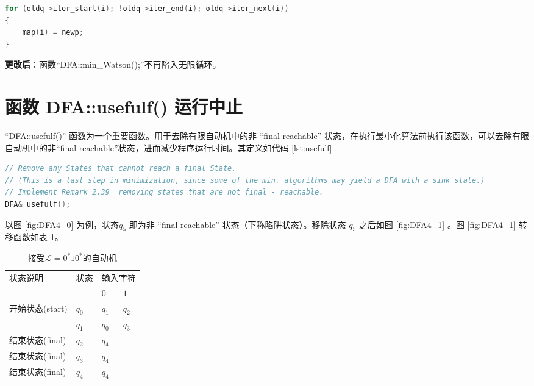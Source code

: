 \begin{lstlisting}[language=C++,label={lst:StateEqRel2},caption={StateEqRel.cpp}]
for (oldq->iter_start(i); !oldq->iter_end(i); oldq->iter_next(i))
{
    map(i) = newp;
}
\end{lstlisting}

{\bfseries 更改后}：函数“DFA::min\_Watson();”不再陷入无限循环。


\section{函数 DFA::usefulf() 运行中止}\label{sec:usefulf}

“DFA::usefulf()” 函数为一个重要函数。用于去除有限自动机中的非 “final-reachable” 状态，在执行最小化算法前执行该函数，可以去除有限自动机中的非“final-reachable”状态，进而减少程序运行时间。其定义如代码 \ref{lst:usefulf}

\begin{lstlisting}[language=C++,label={lst:usefulf},caption={DFA::usefulf()}]
// Remove any States that cannot reach a final State.
// (This is a last step in minimization, since some of the min. algorithms may yield a DFA with a sink state.)
// Implement Remark 2.39  removing states that are not final - reachable.
DFA& usefulf();
\end{lstlisting}
以图 \ref{fig:DFA4_0} 为例，状态$q_5$ 即为非 “final-reachable” 状态（下称陷阱状态）。移除状态 $q_5$ 之后如图 \ref{fig:DFA4_1} 。图 \ref{fig:DFA4_1} 转移函数如表 \ref{tab:DFA4_1}。

\begin{table}[!htbp]
    \caption{接受{$\mathcal{L}=0^*10^*$}的自动机{\cite{book1}}}
    \label{tab:DFA4_1}
    \centering
    \small%
    \setlength{\tabcolsep}{4pt}%
    \renewcommand{\arraystretch}{1.2}%
        \begin{tabular}{l p{4em}<{\centering} p{3em}<{\centering} p{3em}<{\centering}}
        \toprule %
        \multirow{2}{*}{状态说明} & \multirow{2}{*}{状态} & \multicolumn{2}{c}{输入字符} \\
		\cline{3-4}      &    &$0$ & $1$  \\
        \midrule%
        开始状态(start)  & $q_0$ & $q_1$   & $q_2$   \\
                        & $q_1$ & $q_0$   & $q_3$   \\
        结束状态(final) & $q_2$ & $q_4$   & -   \\
        结束状态(final) & $q_3$ & $q_4$   & -   \\
        结束状态(final) & $q_4$ & $q_4$   & -   \\
        \bottomrule%
    \end{tabular}
\end{table}

